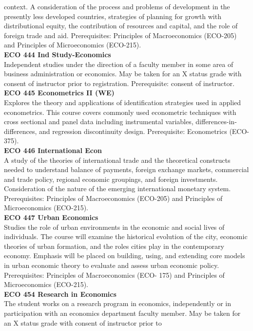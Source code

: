 \documentclass[
  letterpaper,
]{scrbook}
\begin{document}
context. A consideration of the process and problems of development in
the presently less developed countries, strategies of planning for
growth with distributional equity, the contribution of resources and
capital, and the role of foreign trade and aid. Prerequisites:
Principles of Macroeconomics (ECO-205) and Principles of Microeconomics
(ECO-215).\\
\textbf{ECO 444 Ind Study-Economics}\\
Independent studies under the direction of a faculty member in some area
of business administration or economics. May be taken for an X status
grade with consent of instructor prior to registration. Prerequisite:
consent of instructor.\\
\textbf{ECO 445 Econometrics II (WE)}\\
Explores the theory and applications of identification strategies used
in applied econometrics. This course covers commonly used econometric
techniques with cross sectional and panel data including instrumental
variables, differences-in-differences, and regression discontinuity
design. Prerequisite: Econometrics (ECO-375).\\
\textbf{ECO 446 International Econ}\\
A study of the theories of international trade and the theoretical
constructs needed to understand balance of payments, foreign exchange
markets, commercial and trade policy, regional economic groupings, and
foreign investments. Consideration of the nature of the emerging
international monetary system. Prerequisites: Principles of
Macroeconomics (ECO-205) and Principles of Microeconomics (ECO-215).\\
\textbf{ECO 447 Urban Economics}\\
Studies the role of urban environments in the economic and social lives
of individuals. The course will examine the historical evolution of the
city, economic theories of urban formation, and the roles cities play in
the contemporary economy. Emphasis will be placed on building, using,
and extending core models in urban economic theory to evaluate and
assess urban economic policy. Prerequisites: Principles of
Macroeconomics (ECO- 175) and Principles of Microeconomics (ECO-215).\\
\textbf{ECO 454 Research in Economics}\\
The student works on a research program in economics, independently or
in participation with an economics department faculty member. May be
taken for an X status grade with consent of instructor prior to
\end{document}
